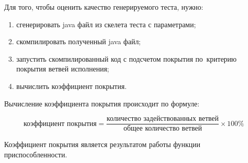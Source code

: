Для того, чтобы оценить качество генерируемого теста, нужно:

\begin{enumerate}
	\item сгенерировать java файл из скелета теста с параметрами;
	\item скомпилировать полученный java файл;
	\item запустить скомпилированный код с подсчетом покрытия по~критерию покрытия ветвей исполнения;
	\item вычислить коэффициент покрытия.
\end{enumerate}

Вычисление коэффициента покрытия происходит по формуле:

\[ \text{коэффициент покрытия} = \frac{\text{количество задействованных ветвей}}{\text{общее количество ветвей}}  \times 100 \% \]

Коэффициент покрытия является результатом работы функции приспособленности.
